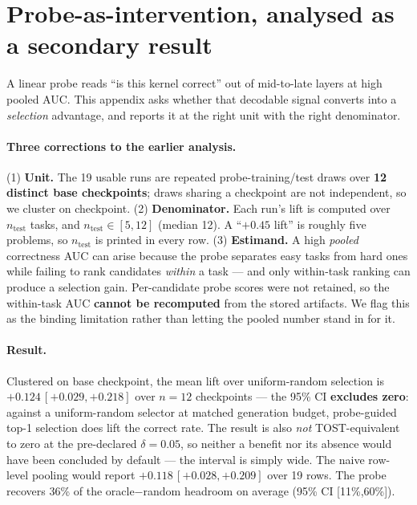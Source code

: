 \section{Probe-as-intervention, analysed as a secondary result}
\label{app:probe}
A linear probe reads ``is this kernel correct'' out of mid-to-late layers at high pooled AUC. This appendix asks
whether that decodable signal converts into a \emph{selection} advantage, and reports it at the right unit with
the right denominator.

\paragraph{Three corrections to the earlier analysis.}
(1) \textbf{Unit.} The 19 usable runs are repeated probe-training/test draws over \textbf{12 distinct base
checkpoints}; draws sharing a checkpoint are not independent, so we cluster on checkpoint.
(2) \textbf{Denominator.} Each run's lift is computed over $n_{\text{test}}$ tasks, and
$n_{\text{test}}\in[5,12]$ (median 12). A ``$+0.45$ lift'' is roughly five problems, so
$n_{\text{test}}$ is printed in every row.
(3) \textbf{Estimand.} A high \emph{pooled} correctness AUC can arise because the probe separates easy tasks
from hard ones while failing to rank candidates \emph{within} a task --- and only within-task ranking can
produce a selection gain. Per-candidate probe scores were not retained, so the within-task AUC
\textbf{cannot be recomputed} from the stored artifacts. We flag this as the binding limitation rather than
letting the pooled number stand in for it.

\paragraph{Result.} Clustered on base checkpoint, the mean lift over uniform-random selection is
$+0.124\,[+0.029,+0.218]$ over $n{=}12$ checkpoints --- the 95\% CI \textbf{excludes zero}: against a uniform-random selector at matched generation budget, probe-guided top-1 selection does lift the correct rate.  The result is also \emph{not} TOST-equivalent to zero at the pre-declared $\delta{=}0.05$, so neither a benefit nor its absence would have been concluded by default --- the interval is simply wide. The naive row-level pooling would report
$+0.118\,[+0.028,+0.209]$ over 19 rows. The probe recovers 36\% of the oracle$-$random headroom on average
(95\% CI [11\%,60\%]).

